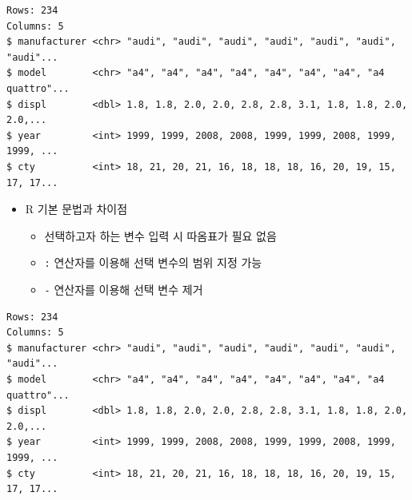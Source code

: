 \documentclass[
  11pt,
]{krantz}
\newenvironment{Shaded}{\begin{snugshade}}{\end{snugshade}}
\newcommand{\CommentTok}[1]{\textcolor[rgb]{0.37,0.37,0.37}{\textit{#1}}}
\newcommand{\KeywordTok}[1]{\textcolor[rgb]{0.27,0.27,0.27}{\textbf{#1}}}
\newcommand{\NormalTok}[1]{#1}
\newcommand{\OperatorTok}[1]{\textcolor[rgb]{0.43,0.43,0.43}{\textbf{#1}}}
\newcommand{\StringTok}[1]{\textcolor[rgb]{0.5,0.5,0.5}{#1}}
\providecommand{\tightlist}{%
  \setlength{\itemsep}{0pt}\setlength{\parskip}{0pt}}
\begin{document}
\begin{verbatim}
Rows: 234
Columns: 5
$ manufacturer <chr> "audi", "audi", "audi", "audi", "audi", "audi", "audi"...
$ model        <chr> "a4", "a4", "a4", "a4", "a4", "a4", "a4", "a4 quattro"...
$ displ        <dbl> 1.8, 1.8, 2.0, 2.0, 2.8, 2.8, 3.1, 1.8, 1.8, 2.0, 2.0,...
$ year         <int> 1999, 1999, 2008, 2008, 1999, 1999, 2008, 1999, 1999, ...
$ cty          <int> 18, 21, 20, 21, 16, 18, 18, 18, 16, 20, 19, 15, 17, 17...
\end{verbatim}

\normalsize

\begin{itemize}
\item
  R 기본 문법과 차이점

  \begin{itemize}
  \tightlist
  \item
    선택하고자 하는 변수 입력 시 따옴표가 필요 없음
  \item
    \texttt{:} 연산자를 이용해 선택 변수의 범위 지정 가능
  \item
    \texttt{-} 연산자를 이용해 선택 변수 제거
  \end{itemize}
\end{itemize}

\footnotesize

\begin{Shaded}
\end{Shaded}

\begin{verbatim}
Rows: 234
Columns: 5
$ manufacturer <chr> "audi", "audi", "audi", "audi", "audi", "audi", "audi"...
$ model        <chr> "a4", "a4", "a4", "a4", "a4", "a4", "a4", "a4 quattro"...
$ displ        <dbl> 1.8, 1.8, 2.0, 2.0, 2.8, 2.8, 3.1, 1.8, 1.8, 2.0, 2.0,...
$ year         <int> 1999, 1999, 2008, 2008, 1999, 1999, 2008, 1999, 1999, ...
$ cty          <int> 18, 21, 20, 21, 16, 18, 18, 18, 16, 20, 19, 15, 17, 17...
\end{verbatim}

\begin{Shaded}
\end{Shaded}
\end{document}
